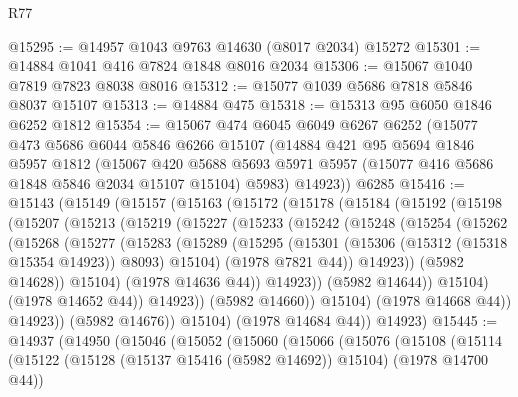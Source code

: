\begin{lexlean}{R77}
\begin{coremodule}
@15295 := @14957 @1043 @9763 @14630 (@8017 @2034) @15272
@15301 := @14884 @1041 @416 @7824 @1848 @8016 @2034
@15306 := @15067 @1040 @7819 @7823 @8038 @8016
@15312 := @15077 @1039 @5686 @7818 @5846 @8037 @15107
@15313 := @14884 @475
@15318 := @15313 @95 @6050 @1846 @6252 @1812
@15354 := @15067
    @474
    @6045
    @6049
    @6267
    @6252
    (@15077
      @473
      @5686
      @6044
      @5846
      @6266
      @15107
      (@14884
        @421
        @95
        @5694
        @1846
        @5957
        @1812
        (@15067
          @420
          @5688
          @5693
          @5971
          @5957
          (@15077 @416 @5686 @1848 @5846 @2034 @15107 @15104)
          @5983)
        @14923))
    @6285
@15416 := @15143
    (@15149
      (@15157
        (@15163
          (@15172
            (@15178
              (@15184
                (@15192
                  (@15198
                    (@15207
                      (@15213
                        (@15219
                          (@15227
                            (@15233
                              (@15242
                                (@15248
                                  (@15254
                                    (@15262
                                      (@15268
                                        (@15277
                                          (@15283
                                            (@15289
                                              (@15295
                                                (@15301
                                                  (@15306 (@15312 (@15318 @15354 @14923)) @8093)
                                                  @15104)
                                                (@1978 @7821 @44))
                                              @14923))
                                          (@5982 @14628))
                                        @15104)
                                      (@1978 @14636 @44))
                                    @14923))
                                (@5982 @14644))
                              @15104)
                            (@1978 @14652 @44))
                          @14923))
                      (@5982 @14660))
                    @15104)
                  (@1978 @14668 @44))
                @14923))
            (@5982 @14676))
          @15104)
        (@1978 @14684 @44))
      @14923)
@15445 := @14937
    (@14950
      (@15046
        (@15052
          (@15060
            (@15066
              (@15076
                (@15108
                  (@15114
                    (@15122 (@15128 (@15137 @15416 (@5982 @14692)) @15104) (@1978 @14700 @44))

\end{coremodule}
\end{lexlean}
